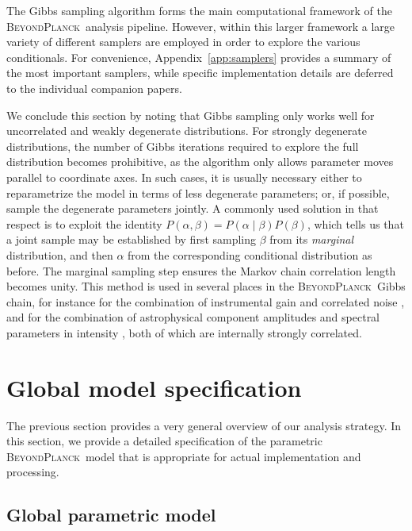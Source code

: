 \documentclass[twocolumn]{aa}
\newcommand{\BP}{\textsc{BeyondPlanck}}
\begin{document}
The Gibbs sampling algorithm forms the main computational framework of
the \BP\ analysis pipeline. However, within this larger framework a
large variety of different samplers are employed in order to explore
the various conditionals. For convenience, Appendix~\ref{app:samplers}
provides a summary of the most important samplers, while specific
implementation details are deferred to the individual companion
papers.

We conclude this section by noting that Gibbs sampling only works well
for uncorrelated and weakly degenerate distributions. For strongly
degenerate distributions, the number of Gibbs iterations required to
explore the full distribution becomes prohibitive, as the algorithm
only allows parameter moves parallel to coordinate axes. In such
cases, it is usually necessary either to reparametrize the model in
terms of less degenerate parameters; or, if possible, sample the
degenerate parameters jointly. A commonly used solution in that respect
is to exploit the identity $P(\alpha,\beta) = P(\alpha\mid
\beta)P(\beta)$, which tells us that a joint sample may be established
by first sampling $\beta$ from its \emph{marginal} distribution, and
then $\alpha$ from the corresponding conditional distribution as
before. The marginal sampling step ensures the Markov chain
correlation length becomes unity. This method is used in several places
in the \BP\ Gibbs chain, for instance for the combination of
instrumental gain and correlated noise \citep{bp07}, and for the
combination of astrophysical component amplitudes and spectral
parameters in intensity \citep{bp13}, both of which are internally
strongly correlated.


\section{Global model specification}
\label{sec:model}

The previous section provides a very general overview of our analysis
strategy. In this section, we provide a detailed specification of the
parametric \BP\ model that is appropriate for actual implementation
and processing.

\subsection{Global parametric model}
\label{sec:unimodel}
\end{document}
